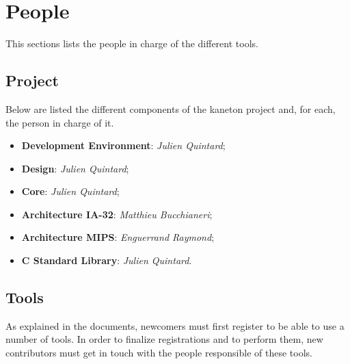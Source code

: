 %
%
%
%
%
%

%
%

\chapter{People}
\label{chapter:people}

This sections lists the people in charge of the different tools.

\newpage

%
%

%
%

\section{Project}

Below are listed the different components of the kaneton project and, for each,
the person in charge of it.

\begin{itemize}
  \item
    \textbf{Development Environment}: \textit{Julien Quintard};
  \item
    \textbf{Design}: \textit{Julien Quintard};
  \item
    \textbf{Core}: \textit{Julien Quintard};
  \item
    \textbf{Architecture IA-32}: \textit{Matthieu Bucchianeri};
  \item
    \textbf{Architecture MIPS}: \textit{Enguerrand Raymond};
  \item
    \textbf{C Standard Library}: \textit{Julien Quintard}.
\end{itemize}

%
%

\section{Tools}

As explained in the documents, newcomers must first register to be able to
use a number of tools. In order to finalize registrations and to perform them,
new contributors must get in touch with the people responsible of these
tools.

